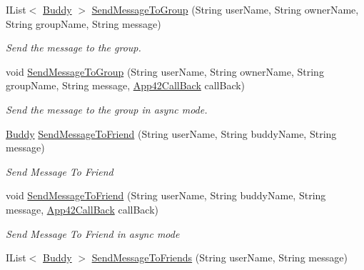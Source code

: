 \begin{DoxyCompactItemize}
I\+List$<$ \hyperlink{classcom_1_1shephertz_1_1app42_1_1paas_1_1sdk_1_1csharp_1_1buddy_1_1_buddy}{Buddy} $>$ \hyperlink{classcom_1_1shephertz_1_1app42_1_1paas_1_1sdk_1_1csharp_1_1buddy_1_1_buddy_service_a4a0bb8efcd45650ac9ed9da33f7f80ba}{Send\+Message\+To\+Group} (String user\+Name, String owner\+Name, String group\+Name, String message)
\begin{DoxyCompactList}\small\item\em Send the message to the group. \end{DoxyCompactList}\item 
void \hyperlink{classcom_1_1shephertz_1_1app42_1_1paas_1_1sdk_1_1csharp_1_1buddy_1_1_buddy_service_ab2842c1eb67e6023675a5c15f85d372d}{Send\+Message\+To\+Group} (String user\+Name, String owner\+Name, String group\+Name, String message, \hyperlink{interfacecom_1_1shephertz_1_1app42_1_1paas_1_1sdk_1_1csharp_1_1_app42_call_back}{App42\+Call\+Back} call\+Back)
\begin{DoxyCompactList}\small\item\em Send the message to the group in async mode. \end{DoxyCompactList}\item 
\hyperlink{classcom_1_1shephertz_1_1app42_1_1paas_1_1sdk_1_1csharp_1_1buddy_1_1_buddy}{Buddy} \hyperlink{classcom_1_1shephertz_1_1app42_1_1paas_1_1sdk_1_1csharp_1_1buddy_1_1_buddy_service_a70c8484c16a335859923369c68b7e9e3}{Send\+Message\+To\+Friend} (String user\+Name, String buddy\+Name, String message)
\begin{DoxyCompactList}\small\item\em Send Message To Friend \end{DoxyCompactList}\item 
void \hyperlink{classcom_1_1shephertz_1_1app42_1_1paas_1_1sdk_1_1csharp_1_1buddy_1_1_buddy_service_a1add6b1768bb5d1e559d920d4b95cc32}{Send\+Message\+To\+Friend} (String user\+Name, String buddy\+Name, String message, \hyperlink{interfacecom_1_1shephertz_1_1app42_1_1paas_1_1sdk_1_1csharp_1_1_app42_call_back}{App42\+Call\+Back} call\+Back)
\begin{DoxyCompactList}\small\item\em Send Message To Friend in async mode \end{DoxyCompactList}\item 
I\+List$<$ \hyperlink{classcom_1_1shephertz_1_1app42_1_1paas_1_1sdk_1_1csharp_1_1buddy_1_1_buddy}{Buddy} $>$ \hyperlink{classcom_1_1shephertz_1_1app42_1_1paas_1_1sdk_1_1csharp_1_1buddy_1_1_buddy_service_aea4d38b296404a749c44180672913ff9}{Send\+Message\+To\+Friends} (String user\+Name, String message)

\end{DoxyCompactItemize}

